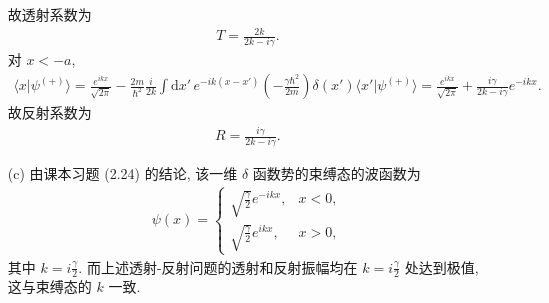 \documentclass{assignment}
\begin{document}
\begin{sol}
\begin{itemize}
        故透射系数为
        \begin{align}
            T=\frac{2k}{2k-i\gamma}.
        \end{align}
        对 $x<-a$,
        \begin{align}
            \langle x\vert\psi^{(+)}\rangle=\frac{e^{ikx}}{\sqrt{2\pi}}-\frac{2m}{\hbar^2}\frac{i}{2k}\int\mathrm{d}x'\,e^{-ik(x-x')}\left(-\frac{\gamma\hbar^2}{2m}\right)\delta(x')\langle x'\vert\psi^{(+)}\rangle=\frac{e^{ikx}}{\sqrt{2\pi}}+\frac{i\gamma}{2k-i\gamma}e^{-ikx}.
        \end{align}
        故反射系数为
        \begin{align}
            R=\frac{i\gamma}{2k-i\gamma}.
        \end{align}
        \item[(c)] 由课本习题 (2.24) 的结论, 该一维 $\delta$ 函数势的束缚态的波函数为
        \begin{align}
            \psi(x)=\left\{\begin{array}{ll}
                \sqrt{\frac{\gamma}{2}}e^{-ikx},&x<0,\\
                \sqrt{\frac{\gamma}{2}}e^{ikx},&x>0,
            \end{array}\right.
        \end{align}
        其中 $k=i\frac{\gamma}{2}$. 而上述透射-反射问题的透射和反射振幅均在 $k=i\frac{\gamma}{2}$ 处达到极值, 这与束缚态的 $k$ 一致.
    \end{itemize}
\end{sol}
\end{document}
